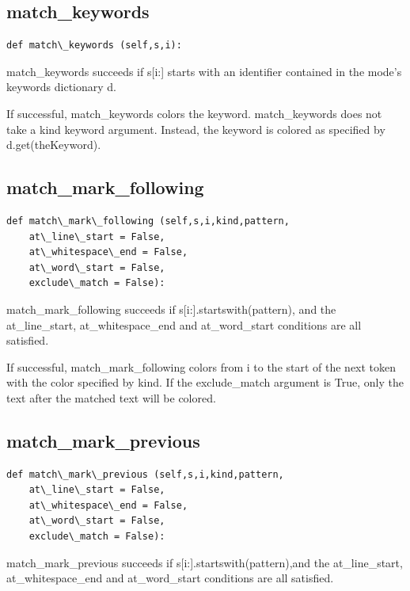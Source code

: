 \documentclass[a4paper,10pt,english]{sphinxmanual}
\begin{document}
\subsection{match\_keywords}
\label{coloring:match-keywords}
\begin{Verbatim}[commandchars=\\\{\}]
def match\_keywords (self,s,i):
\end{Verbatim}

match\_keywords succeeds if s{[}i:{]} starts with an identifier contained in the mode's keywords dictionary d.

If successful, match\_keywords colors the keyword.
match\_keywords does not take a kind keyword argument.
Instead, the keyword is colored as specified by d.get(theKeyword).


\subsection{match\_mark\_following}
\label{coloring:match-mark-following}
\begin{Verbatim}[commandchars=\\\{\}]
def match\_mark\_following (self,s,i,kind,pattern,
    at\_line\_start = False,
    at\_whitespace\_end = False,
    at\_word\_start = False,
    exclude\_match = False):
\end{Verbatim}

match\_mark\_following succeeds if s{[}i:{]}.startswith(pattern), and
the at\_line\_start, at\_whitespace\_end and at\_word\_start conditions are all satisfied.

If successful, match\_mark\_following colors from i to the start of the next token
with the color specified by kind.
If the exclude\_match argument is True, only the text after the matched text will be colored.


\subsection{match\_mark\_previous}
\label{coloring:match-mark-previous}
\begin{Verbatim}[commandchars=\\\{\}]
def match\_mark\_previous (self,s,i,kind,pattern,
    at\_line\_start = False,
    at\_whitespace\_end = False,
    at\_word\_start = False,
    exclude\_match = False):
\end{Verbatim}

match\_mark\_previous succeeds if s{[}i:{]}.startswith(pattern),and
the at\_line\_start, at\_whitespace\_end and at\_word\_start conditions are all satisfied.
\end{document}
